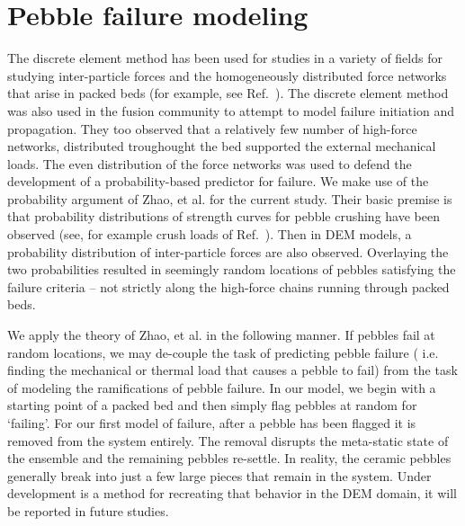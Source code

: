
\section{Pebble failure modeling}
\label{failureDiscussion}

The discrete element method has been used for studies in a variety of fields for studying inter-particle forces and the homogeneously distributed force networks that arise in packed beds (for example, see Ref.~\cite{Makse2000}). The discrete element method was also used in the fusion community to attempt to model failure initiation and propagation\cite{Annabattula2012a, Zhao2012, Zhao2013}. They too observed that a relatively few number of high-force networks, distributed troughought the bed supported the external mechanical loads. The even distribution of the force networks was used to defend the development of a probability-based predictor for failure. We make use of the probability argument of Zhao, {et al.} for the current study\cite{Zhao2013}. Their basic premise is that probability distributions of strength curves for pebble crushing have been observed (see, for example crush loads of Ref.~\cite{Tsuchiya1998}). Then in DEM models, a probability distribution of inter-particle forces are also observed. Overlaying the two probabilities resulted in seemingly random locations of pebbles satisfying the failure criteria -- not strictly along the high-force chains running through packed beds.

We apply the theory of Zhao, { et al.} in the following manner. If pebbles fail at random locations, we may de-couple the task of predicting pebble failure ({ i.e.} finding the mechanical or thermal load that causes a pebble to fail) from the task of modeling the ramifications of pebble failure. In our model, we begin with a starting point of a packed bed and then simply flag pebbles at random for `failing'. For our first model of failure, after a pebble has been flagged it is removed from the system entirely. The removal disrupts the meta-static state of the ensemble and the remaining pebbles re-settle. In reality, the ceramic pebbles generally break into just a few large pieces that remain in the system. Under development is a method for recreating that behavior in the DEM domain, it will be reported in future studies.

